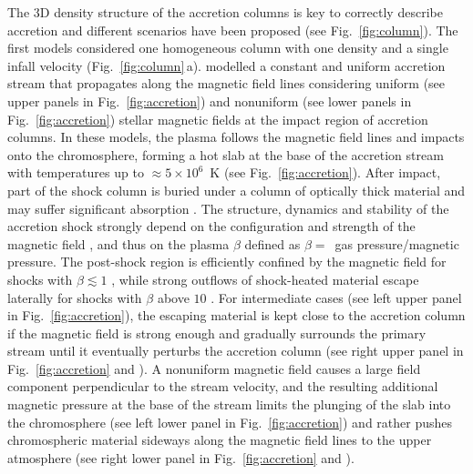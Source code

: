 \documentclass[graybox, nosecnum]{svmult}
\begin{document}
The 3D density structure of the accretion columns is key to correctly describe accretion and 
different scenarios have been proposed (see Fig.~\ref{fig:column}). The first models considered one homogeneous column with one density and a single infall velocity (Fig.~\ref{fig:column}\,a). 
\citet{Orlando_2010, Orlando_2013} modelled a constant and uniform accretion stream that propagates along the magnetic field lines considering uniform  (see upper panels in Fig.~\ref{fig:accretion}) and nonuniform  (see lower panels in Fig.~\ref{fig:accretion}) stellar magnetic fields at the impact region of accretion columns. In these models, the plasma follows the magnetic field lines and impacts onto the chromosphere, forming a hot slab at the base of the accretion stream with temperatures up to $\approx 5\times10^6$~K (see Fig.~\ref{fig:accretion}). After impact, part of the shock column is buried under a column of optically thick material and may suffer significant absorption \cite{Orlando_2010,Orlando_2013}.
The structure, dynamics and stability of the accretion shock strongly depend on the configuration and strength of the magnetic field \cite{Orlando_2010}, and thus on the plasma $\beta$ defined as $\beta =$~gas pressure/magnetic pressure. 
The post-shock region is efficiently confined by the magnetic field for shocks with $\beta \lesssim 1$ , while strong outflows of shock-heated material 
escape laterally for shocks with $\beta$ above $10$ \cite{Orlando_2010,Orlando_2013}. For intermediate cases (see left upper panel in Fig.~\ref{fig:accretion}), the escaping material is kept close to the accretion column 
if the magnetic field is strong enough and gradually surrounds the primary stream until it eventually perturbs the accretion column (see right upper panel in Fig.~\ref{fig:accretion} and \cite{Orlando_2010}). 
A nonuniform magnetic field causes a large field component perpendicular to the stream velocity, and the resulting additional magnetic pressure at the base of the stream limits the plunging of the slab into the chromosphere (see left lower panel in Fig.~\ref{fig:accretion}) and rather pushes chromospheric material sideways along the magnetic field lines to the upper atmosphere (see right lower panel in Fig.~\ref{fig:accretion} and \cite{Orlando_2013}). 
\end{document}
